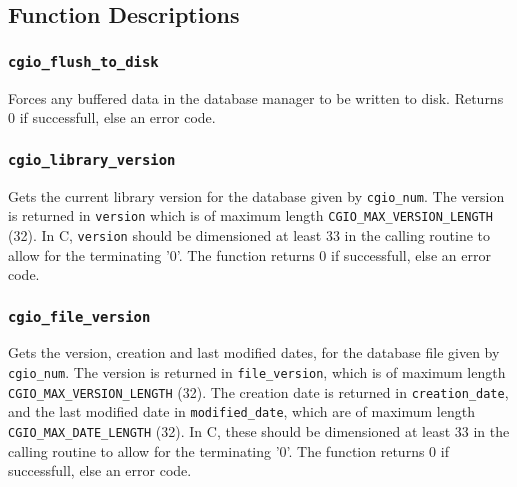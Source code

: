 \subsection{Function Descriptions}

\subsubsection{\texttt{cgio\_flush\_to\_disk}} \label{flush_to_disk}
    \noindent
    Forces any buffered data in the database manager to be written
    to disk. Returns 0 if successfull, else an error code.

\subsubsection{\texttt{cgio\_library\_version}} \label{library_version}
    \noindent
    Gets the current library version for the database given by \texttt{cgio\_num}.
    The version is returned in \texttt{version} which is of maximum length
    \texttt{CGIO\_MAX\_VERSION\_LENGTH} (32). In C, \texttt{version} should
    be dimensioned at least 33 in the calling routine to allow for the
    terminating '0'.
    The function returns 0 if successfull, else an error code.

\subsubsection{\texttt{cgio\_file\_version}} \label{file_version}
    \noindent
    Gets the version, creation and last modified dates, for the database
    file given by \texttt{cgio\_num}. The version is returned in
    \texttt{file\_version}, which is of maximum length
    \texttt{CGIO\_MAX\_VERSION\_LENGTH} (32). The creation date is returned in
    \texttt{creation\_date}, and the last modified date in \texttt{modified\_date},
    which are of maximum length \texttt{CGIO\_MAX\_DATE\_LENGTH} (32).
    In C, these should be dimensioned at least 33 in the calling routine
    to allow for the terminating '0'.
    The function returns 0 if successfull, else an error code.

